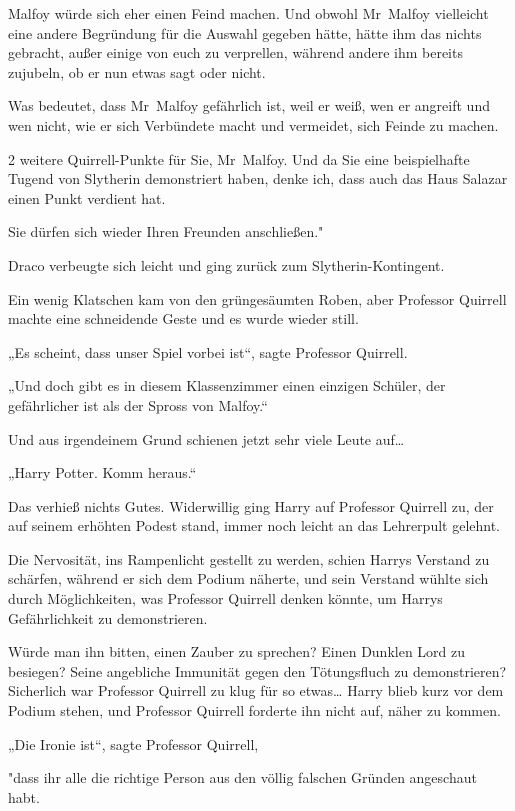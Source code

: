 {Malfoy würde sich eher einen Feind machen. Und obwohl Mr~Malfoy vielleicht eine andere Begründung für die Auswahl gegeben hätte, hätte ihm das nichts gebracht, außer einige von euch zu verprellen, während andere ihm bereits zujubeln, ob er nun etwas sagt oder nicht.

Was bedeutet, dass Mr~Malfoy gefährlich ist, weil er weiß, wen er angreift und wen nicht, wie er sich Verbündete macht und vermeidet, sich Feinde zu machen.

2 weitere Quirrell-Punkte für Sie, Mr~Malfoy. Und da Sie eine beispielhafte Tugend von Slytherin demonstriert haben, denke ich, dass auch das Haus Salazar einen Punkt verdient hat.

Sie dürfen sich wieder Ihren Freunden anschließen."

Draco verbeugte sich leicht und ging zurück zum Slytherin-Kontingent.

Ein wenig Klatschen kam von den grüngesäumten Roben, aber Professor Quirrell machte eine schneidende Geste und es wurde wieder still.

„Es scheint, dass unser Spiel vorbei ist“, sagte Professor Quirrell.

„Und doch gibt es in diesem Klassenzimmer einen einzigen Schüler, der gefährlicher ist als der Spross von Malfoy.“

Und aus irgendeinem Grund schienen jetzt sehr viele Leute auf…

„Harry Potter. Komm heraus.“

Das verhieß nichts Gutes. Widerwillig ging Harry auf Professor Quirrell zu, der auf seinem erhöhten Podest stand, immer noch leicht an das Lehrerpult gelehnt.

Die Nervosität, ins Rampenlicht gestellt zu werden, schien Harrys Verstand zu schärfen, während er sich dem Podium näherte, und sein Verstand wühlte sich durch Möglichkeiten, was Professor Quirrell denken könnte, um Harrys Gefährlichkeit zu demonstrieren.

Würde man ihn bitten, einen Zauber zu sprechen? Einen Dunklen Lord zu besiegen? Seine angebliche Immunität gegen den Tötungsfluch zu demonstrieren? Sicherlich war Professor Quirrell zu klug für so etwas… Harry blieb kurz vor dem Podium stehen, und Professor Quirrell forderte ihn nicht auf, näher zu kommen.

„Die Ironie ist“, sagte Professor Quirrell,

"dass ihr alle die richtige Person aus den völlig falschen Gründen angeschaut habt.

}
